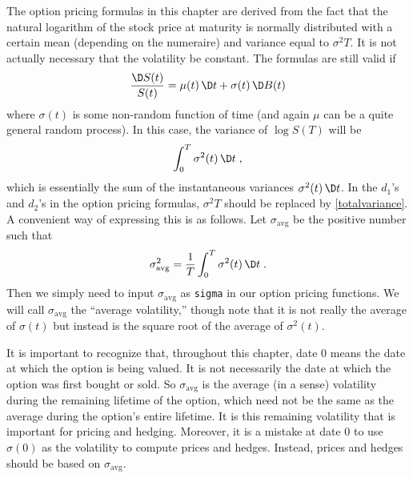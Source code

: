 The option pricing formulas in this chapter are derived from the fact that the natural logarithm of the stock price at maturity is normally distributed with a certain mean (depending on the numeraire) and variance equal to $\sigma^2T$.  It is not actually necessary that the volatility be constant.  The formulas are still valid if
$$\frac{\D S(t)}{S(t)}= \mu(t)\,\D t + \sigma(t)\,\D B(t)$$
where $\sigma(t)$ is some non-random function of time (and again $\mu$ can be a quite general random process).  In this case, the variance of $\log S(T)$ will be
\begin{equation}\label{totalvariance}
\int_0^T \sigma^2(t)\,\D t\;,
\end{equation}
which is essentially the sum of the instantaneous variances $\sigma^2(t)\,\D t$.  In the $d_1$'s and $d_2$'s in the option pricing formulas, $\sigma^2T$ should be replaced by \eqref{totalvariance}.  A convenient way of expressing this is as follows.  Let $\sigma_{\text{avg}}$ be the positive number such that
\begin{equation}\label{sigmaavg100}
\sigma_{\text{avg}}^2 = \frac{1}{T}\int_0^T \sigma^2(t)\,\D t\;.
\end{equation}
Then we simply need to input $\sigma_{\text{avg}}$ as \verb!sigma! in our option pricing functions.  We will call $\sigma_{\text{avg}}$ the ``average volatility,'' though note that it is not really the average of $\sigma(t)$ but instead is the square root of the average of $\sigma^2(t)$.

It is important to recognize that, throughout this chapter, date 0 means the date at which the option is being valued.  It is not necessarily the date at which the option was first bought or sold.  So $\sigma_{\text{avg}}$ is the average (in a sense) volatility during the remaining lifetime of the option, which need not be the same as the average during the option's  entire lifetime.  It is this remaining volatility that is important for pricing and hedging.  Moreover, it is a mistake at date 0 to use $\sigma(0)$ as the volatility to compute prices and hedges.  Instead, prices and hedges should be based on $\sigma_{\text{avg}}$.

